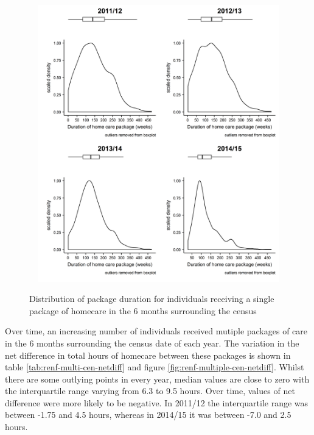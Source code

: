 \documentclass[]{article}
\begin{document}
\begin{figure}[]
  \centering
    \caption{Distribution of package duration for individuals receiving a single package of homecare in the 6 months surrounding the census}
    \includegraphics[height = 12cm, width = 16cm]{figures/chapter-renf/15-census-singles-length.png}
    \label{fig:renf-single-cen-distribution}
\end{figure}

Over time, an increasing number of individuals received mutiple packages
of care in the 6 months surrounding the census date of each year. The
variation in the net difference in total hours of homecare between these
packages is shown in table \ref{tab:renf-multi-cen-netdiff} and figure
\ref{fig:renf-multiple-cen-netdiff}. Whilst there are some outlying
points in every year, median values are close to zero with the
interquartile range varying from 6.3 to 9.5 hours. Over time, values of
net difference were more likely to be negative. In 2011/12 the
interquartile range was between -1.75 and 4.5 hours, whereas in 2014/15
it was between -7.0 and 2.5 hours.
\end{document}
